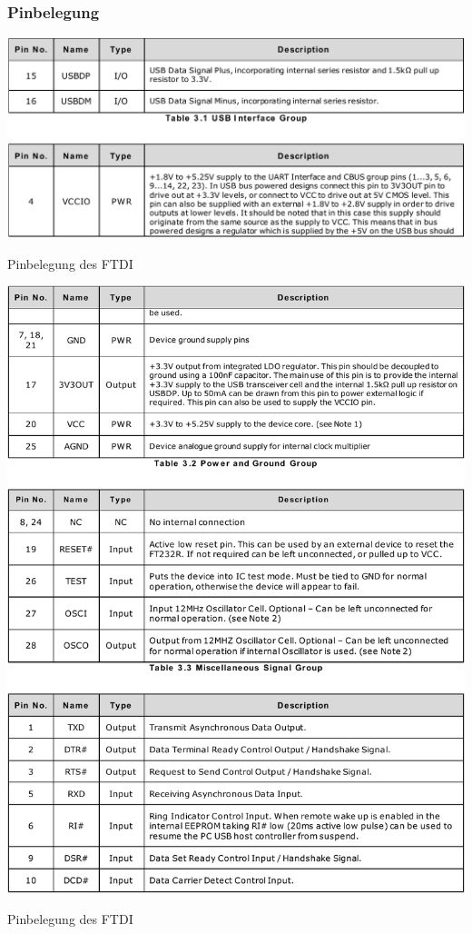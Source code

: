\subsubsection{Pinbelegung}
\begin{table}[H]
    \centering
    \includegraphics[width=\textwidth]{Schuh/Pictures/usbtouart-ftdi-pin1}
    \caption[Pinbelegung des FTDI]{Pinbelegung des FTDI \cite{ftdi:ft232r}}
    \label{tab:usbtouart-ftdi-pin}
\end{table}
\begin{table}[H]\ContinuedFloat
    \centering
    \includegraphics[width=\textwidth]{Schuh/Pictures/usbtouart-ftdi-pin2}
    \caption[Pinbelegung des FTDI]{Pinbelegung des FTDI \cite{ftdi:ft232r}}
\end{table}
